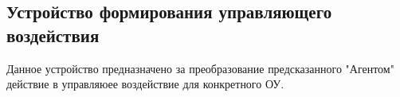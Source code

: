 \subsection{Устройство формирования управляющего воздействия} \label{subsect2_2_5}
Данное устройство предназначено за преобразование предсказанного "Агентом" действие в управляюее воздействие для конкретного ОУ.

